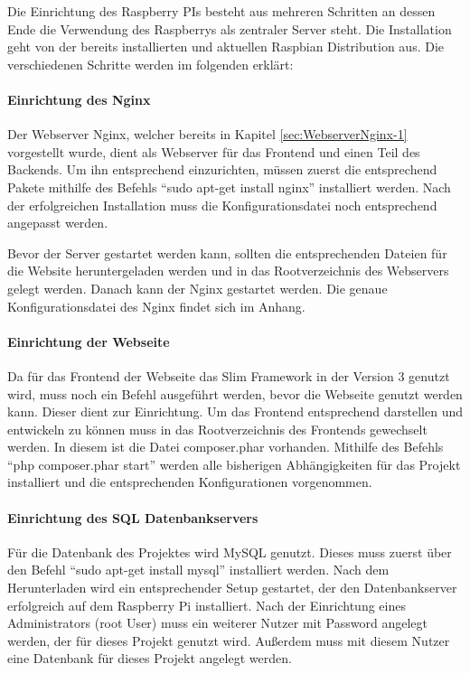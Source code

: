 Die Einrichtung des Raspberry PIs besteht aus mehreren Schritten an dessen Ende die Verwendung des Raspberrys als zentraler Server steht. Die Installation geht von der bereits installierten und aktuellen Raspbian Distribution aus. Die verschiedenen Schritte werden im folgenden erklärt: 
\paragraph{Einrichtung des Nginx} $\;$ \\ 
\label{sec:Einrichtung des Nginx-1} 
Der Webserver Nginx, welcher bereits in Kapitel \ref{sec:WebserverNginx-1} vorgestellt wurde, dient als Webserver für das Frontend und einen Teil des Backends. Um ihn entsprechend einzurichten, müssen zuerst die entsprechend Pakete mithilfe des Befehls ``sudo apt-get install nginx'' installiert werden. Nach der erfolgreichen Installation muss die Konfigurationsdatei noch entsprechend angepasst werden. 

Bevor der Server gestartet werden kann, sollten die entsprechenden Dateien für die Website heruntergeladen werden und in das Rootverzeichnis des Webservers gelegt werden. Danach kann der Nginx gestartet werden. Die genaue Konfigurationsdatei des Nginx findet sich im Anhang. 

\paragraph{Einrichtung der Webseite} $\;$ \\ 
\label{sec:EinrichtungderWebseite} 
Da für das Frontend der Webseite das Slim Framework in der Version 3 genutzt wird, muss noch ein Befehl ausgeführt werden, bevor die Webseite genutzt werden kann. Dieser dient zur Einrichtung. Um das Frontend entsprechend darstellen und entwickeln zu können muss in das Rootverzeichnis des Frontends gewechselt werden. In diesem ist die Datei composer.phar vorhanden. Mithilfe des Befehls ``php composer.phar start'' werden alle bisherigen Abhängigkeiten für das Projekt installiert und die entsprechenden Konfigurationen vorgenommen.

\paragraph{Einrichtung des SQL Datenbankservers}$\;$ \\
\label{sec:Einrichtung des SQL Datenbankservers-1} 
Für die Datenbank des Projektes wird MySQL genutzt. Dieses muss zuerst über den Befehl ``sudo apt-get install mysql'' installiert werden. Nach dem Herunterladen wird ein entsprechender Setup gestartet, der den Datenbankserver erfolgreich auf dem Raspberry Pi installiert. Nach der Einrichtung eines Administrators (root User) muss ein weiterer Nutzer mit Password angelegt werden, der für dieses Projekt genutzt wird. Außerdem muss mit diesem Nutzer eine Datenbank für dieses Projekt angelegt werden.

